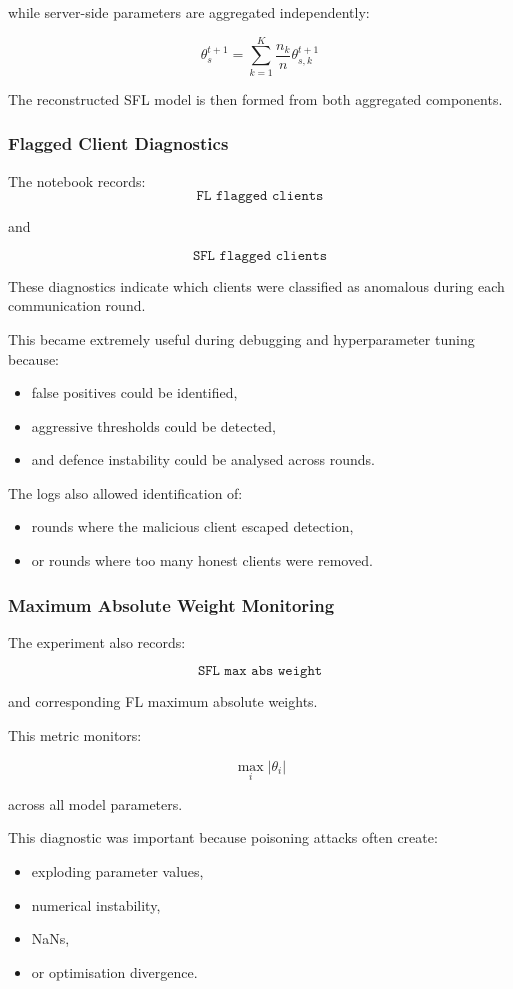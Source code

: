 while server-side parameters are aggregated independently:

\[
\theta_s^{t+1}
=
\sum_{k=1}^{K}
\frac{n_k}{n}
\theta_{s,k}^{t+1}
\]

The reconstructed SFL model is then formed from both aggregated components.

\subsubsection*{Flagged Client Diagnostics}

The notebook records:
\[
\texttt{FL flagged clients}
\]

and

\[
\texttt{SFL flagged clients}
\]

These diagnostics indicate which clients were classified as anomalous during each communication round.

This became extremely useful during debugging and hyperparameter tuning because:
\begin{itemize}
    \item false positives could be identified,
    \item aggressive thresholds could be detected,
    \item and defence instability could be analysed across rounds.
\end{itemize}

The logs also allowed identification of:
\begin{itemize}
    \item rounds where the malicious client escaped detection,
    \item or rounds where too many honest clients were removed.
\end{itemize}

\subsubsection*{Maximum Absolute Weight Monitoring}

The experiment also records:

\[
\texttt{SFL max abs weight}
\]

and corresponding FL maximum absolute weights.

This metric monitors:

\[
\max_i |\theta_i|
\]

across all model parameters.

This diagnostic was important because poisoning attacks often create:
\begin{itemize}
    \item exploding parameter values,
    \item numerical instability,
    \item NaNs,
    \item or optimisation divergence.
\end{itemize}


